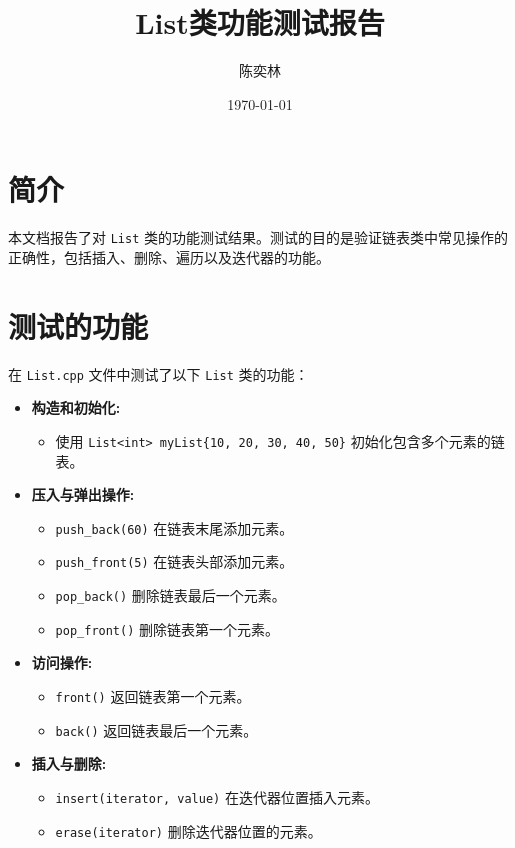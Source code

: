 \documentclass{article}
\title{List类功能测试报告}
\author{陈奕林}
\date{\today}
\begin{document}
\maketitle

\section{简介}
本文档报告了对 \texttt{List} 类的功能测试结果。测试的目的是验证链表类中常见操作的正确性，包括插入、删除、遍历以及迭代器的功能。

\section{测试的功能}
在 \texttt{List.cpp} 文件中测试了以下 \texttt{List} 类的功能：

\begin{itemize}
    \item \textbf{构造和初始化:}
        \begin{itemize}
            \item 使用 \texttt{List<int> myList\{10, 20, 30, 40, 50\}} 初始化包含多个元素的链表。
        \end{itemize}
    \item \textbf{压入与弹出操作:}
        \begin{itemize}
            \item \texttt{push\_back(60)} 在链表末尾添加元素。
            \item \texttt{push\_front(5)} 在链表头部添加元素。
            \item \texttt{pop\_back()} 删除链表最后一个元素。
            \item \texttt{pop\_front()} 删除链表第一个元素。
        \end{itemize}
    \item \textbf{访问操作:}
        \begin{itemize}
            \item \texttt{front()} 返回链表第一个元素。
            \item \texttt{back()} 返回链表最后一个元素。
        \end{itemize}
    \item \textbf{插入与删除:}
        \begin{itemize}
            \item \texttt{insert(iterator, value)} 在迭代器位置插入元素。
            \item \texttt{erase(iterator)} 删除迭代器位置的元素。
        \end{itemize}

\end{itemize}
\end{document}
